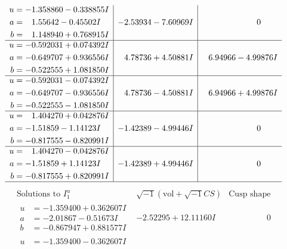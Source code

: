 \documentclass[1p]{elsarticle_modified}
\theoremstyle{definition}
\newcommand{\I}{\sqrt{-1}}
\begin{document}
$$\begin{array}{c|c|c}
\begin{aligned}
u &= -1.358860 - 0.338855 I \\
a &= \phantom{-}1.55642 - 0.45502 I \\
b &= \phantom{-}1.148940 + 0.768915 I\end{aligned}
 & -2.53934 - 7.60969 I & \phantom{-0.000000 } 0 \\ \hline\begin{aligned}
u &= -0.592031 + 0.074392 I \\
a &= -0.649707 + 0.936556 I \\
b &= -0.522555 + 1.081850 I\end{aligned}
 & \phantom{-}4.78736 + 4.50881 I & \phantom{-}6.94966 - 4.99876 I \\ \hline\begin{aligned}
u &= -0.592031 - 0.074392 I \\
a &= -0.649707 - 0.936556 I \\
b &= -0.522555 - 1.081850 I\end{aligned}
 & \phantom{-}4.78736 - 4.50881 I & \phantom{-}6.94966 + 4.99876 I \\ \hline\begin{aligned}
u &= \phantom{-}1.404270 + 0.042876 I \\
a &= -1.51859 - 1.14123 I \\
b &= -0.817555 - 0.820991 I\end{aligned}
 & -1.42389 - 4.99446 I & \phantom{-0.000000 } 0 \\ \hline\begin{aligned}
u &= \phantom{-}1.404270 - 0.042876 I \\
a &= -1.51859 + 1.14123 I \\
b &= -0.817555 + 0.820991 I\end{aligned}
 & -1.42389 + 4.99446 I & \phantom{-0.000000 } 0\\
 \hline 
 \end{array}$$\newpage$$\begin{array}{c|c|c}  
\text{Solutions to }I^u_{1}& \I (\text{vol} + \sqrt{-1}CS) & \text{Cusp shape}\\
 \hline 
\begin{aligned}
u &= -1.359400 + 0.362607 I \\
a &= -2.01867 - 0.51673 I \\
b &= -0.867947 + 0.881577 I\end{aligned}
 & -2.52295 + 12.11160 I & \phantom{-0.000000 } 0 \\ \hline\begin{aligned}
u &= -1.359400 - 0.362607 I \\

\end{aligned}
\end{array}$$
\end{document}
